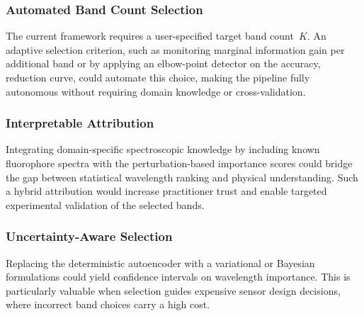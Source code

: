 \subsubsection{Automated Band Count Selection}
The current framework requires a user-specified target band count~$K$.
An adaptive selection criterion, such as monitoring marginal information
gain per additional band or by applying an elbow-point detector on the
accuracy, reduction curve, could
automate this choice, making the pipeline fully autonomous without
requiring domain knowledge or cross-validation.

\subsubsection{Interpretable Attribution}
Integrating domain-specific spectroscopic knowledge by including known fluorophore spectra with the perturbation-based importance scores could bridge the gap between statistical wavelength ranking and physical understanding. Such a hybrid attribution would increase practitioner trust and enable targeted experimental validation of the selected bands.

\subsubsection{Uncertainty-Aware Selection}
Replacing the deterministic autoencoder with a variational or Bayesian
formulations could yield confidence intervals on wavelength importance.
This is particularly valuable when selection guides expensive sensor design
decisions, where incorrect band choices carry a high cost.